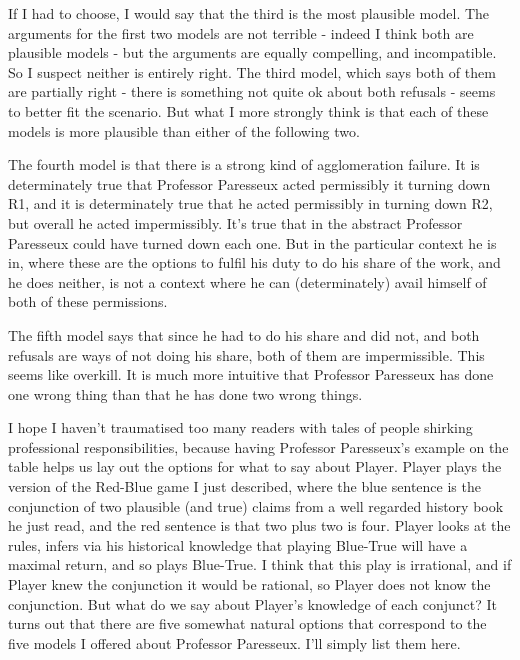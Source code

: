 \documentclass[
  12pt,
  letterpaper,
]{scrbook}
\begin{document}
If I had to choose, I would say that the third is the most plausible
model. The arguments for the first two models are not terrible - indeed
I think both are plausible models - but the arguments are equally
compelling, and incompatible. So I suspect neither is entirely right.
The third model, which says both of them are partially right - there is
something not quite ok about both refusals - seems to better fit the
scenario. But what I more strongly think is that each of these models is
more plausible than either of the following two.

The fourth model is that there is a strong kind of agglomeration
failure. It is determinately true that Professor Paresseux acted
permissibly it turning down R1, and it is determinately true that he
acted permissibly in turning down R2, but overall he acted
impermissibly. It's true that in the abstract Professor Paresseux could
have turned down each one. But in the particular context he is in, where
these are the options to fulfil his duty to do his share of the work,
and he does neither, is not a context where he can (determinately) avail
himself of both of these permissions.

The fifth model says that since he had to do his share and did not, and
both refusals are ways of not doing his share, both of them are
impermissible. This seems like overkill. It is much more intuitive that
Professor Paresseux has done one wrong thing than that he has done two
wrong things.

I hope I haven't traumatised too many readers with tales of people
shirking professional responsibilities, because having Professor
Paresseux's example on the table helps us lay out the options for what
to say about Player. Player plays the version of the Red-Blue game I
just described, where the blue sentence is the conjunction of two
plausible (and true) claims from a well regarded history book he just
read, and the red sentence is that two plus two is four. Player looks at
the rules, infers via his historical knowledge that playing Blue-True
will have a maximal return, and so plays Blue-True. I think that this
play is irrational, and if Player knew the conjunction it would be
rational, so Player does not know the conjunction. But what do we say
about Player's knowledge of each conjunct? It turns out that there are
five somewhat natural options that correspond to the five models I
offered about Professor Paresseux. I'll simply list them here.
\end{document}
